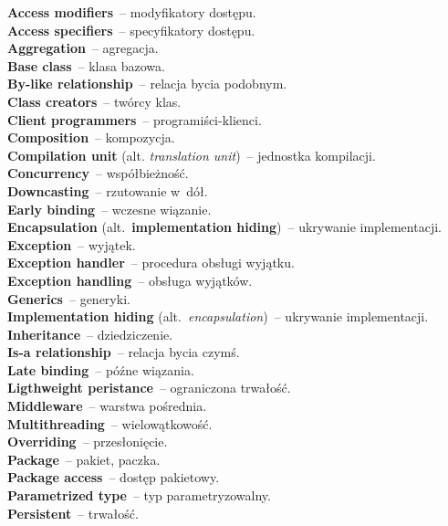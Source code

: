 \documentclass[a4paper,11pt]{article}
\begin{document}
\noindent
\textbf{Access modifiers}~-- modyfikatory dostępu. \\
\textbf{Access specifiers}~-- specyfikatory dostępu. \\
\textbf{Aggregation}~-- agregacja. \\
\textbf{Base class}~-- klasa bazowa. \\
\textbf{By-like relationship}~-- relacja bycia podobnym. \\
\textbf{Class creators}~-- twórcy klas. \\
\textbf{Client programmers}~-- programiści-klienci. \\
\textbf{Composition}~-- kompozycja. \\
\textbf{Compilation unit} (alt. \textit{translation unit})~-- jednostka
kompilacji. \\
\textbf{Concurrency}~-- współbieżność. \\
\textbf{Downcasting}~-- rzutowanie w~dół. \\
\textbf{Early binding}~-- wczesne wiązanie. \\
\textbf{Encapsulation} (alt.~\textbf{implementation hiding})~--
ukrywanie implementacji. \\
\textbf{Exception}~-- wyjątek. \\
\textbf{Exception handler}~-- procedura obsługi wyjątku. \\
\textbf{Exception handling}~-- obsługa wyjątków. \\
\textbf{Generics}~-- generyki. \\
\textbf{Implementation hiding} (alt.~\textit{encapsulation})~--
ukrywanie implementacji. \\
\textbf{Inheritance}~-- dziedziczenie. \\
\textbf{Is-a relationship}~-- relacja bycia czymś. \\
\textbf{Late binding}~-- późne wiązania. \\
\textbf{Ligthweight peristance}~-- ograniczona trwałość. \\
\textbf{Middleware}~-- warstwa pośrednia. \\
\textbf{Multithreading}~-- wielowątkowość. \\
\textbf{Overriding}~-- przesłonięcie. \\
\textbf{Package}~-- pakiet, paczka. \\
\textbf{Package access}~-- dostęp pakietowy. \\
\textbf{Parametrized type}~-- typ parametryzowalny. \\
\textbf{Persistent}~-- trwałość. \\
\end{document}
